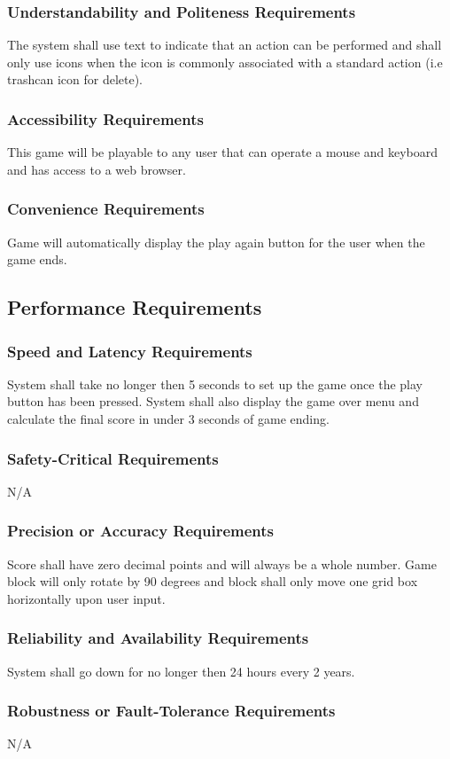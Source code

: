 \documentclass[12pt, titlepage]{article}
\begin{document}
\subsubsection{Understandability and Politeness Requirements }
The system shall use text to indicate that an action can be performed and shall only use icons when the icon is commonly associated with a standard action (i.e trashcan icon for delete).
\subsubsection{Accessibility Requirements}
This game will be playable to any user that can operate a mouse and keyboard and has access to a web browser.
\subsubsection{Convenience Requirements}
Game will automatically display the play again button for the user when the game ends.


\subsection{Performance Requirements}
\subsubsection{Speed and Latency Requirements}
System shall take no longer then 5 seconds to set up the game once the play button has been pressed. System shall also display the game over menu and calculate the final score in under 3 seconds of game ending.
\subsubsection{Safety-Critical Requirements}
N/A
\subsubsection{Precision or Accuracy Requirements}
Score shall have zero decimal points and will always be a whole number. Game block will only rotate by 90 degrees and block shall only move one grid box horizontally upon user input.
\subsubsection{Reliability and Availability Requirements}
System shall go down for no longer then 24 hours every 2 years.
\subsubsection{Robustness or Fault-Tolerance Requirements}
N/A
\end{document}
